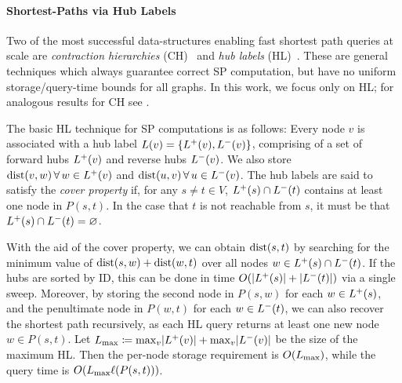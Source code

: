 \paragraph{Shortest-Paths via Hub Labels}
\label{ssec:hldef}
Two of the most successful data-structures enabling fast shortest path queries at scale are \emph{contraction hierarchies} (CH)~\cite{geisberger_ch_definition} and \emph{hub labels} (HL)~\cite{cohen_definition_hl}.
These are general techniques which always guarantee correct SP computation, but have no uniform storage/query-time bounds for all graphs. 
In this work, we focus only on HL; for analogous results for CH see \cite{TechReport}. %

The basic HL technique for SP computations is as follows:
Every node $v$ is associated with a hub label $L(v) = \crl*{\Lf(v),\Lb(v)}$, comprising of a set of forward hubs $\Lf(v)$ and reverse hubs $\Lb(v)$.
We also store $\dist(v,w) \,\forall\, w\in\Lf(v)$ and $\dist(u,v)\,\forall\,u\in\Lb(v)$.
The hub labels are said to satisfy the \emph{cover property} if, for any $s\neq t\in V$, $\Lf(s)\cap\Lb(t)$ contains at least one node in $P(s,t)$.
In the case that $t$ is not reachable from $s$, it must be that $\Lf(s)\cap\Lb(t)=\varnothing$.

With the aid of the cover property, we can obtain $\dist(s,t)$ by searching for the minimum value of $\dist(s,w)+\dist(w,t)$ over all nodes $w\in\Lf(s)\cap\Lb(t)$.
If the hubs are sorted by ID, this can be done in time $\Or(\card{\Lf(s)}+\card{\Lb(t)})$ via a single sweep.
Moreover, by storing the second node in $P(s,w)$ for each $w\in \Lf(s)$, and the penultimate node in $P(w,t)$ for each $w\in \Lb(t)$, we can also recover the shortest path recursively, as each HL query returns at least one new node $w\in P(s,t)$.
Let $\Lm \defeq \max_v\abs*{\Lf(v)}+\max_v\abs*{\Lb(v)}$ be the size of the maximum HL.
Then the per-node storage requirement is $\Or(\Lm)$, while the query time is $\Or(\Lm\ell(P(s,t)))$.

